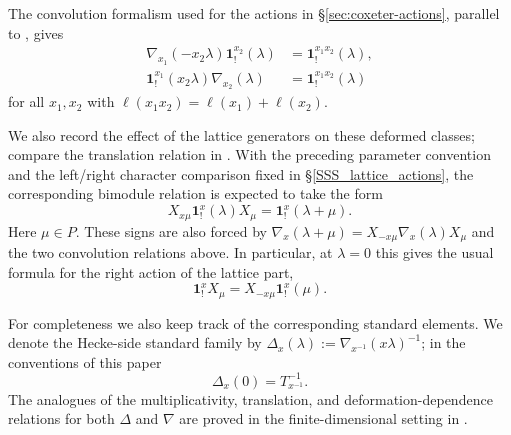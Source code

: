 \documentclass{amsart}
\newcommand{\bone}{\mathbf{1}}
\theoremstyle{definition}
\numberwithin{equation}{section}
\begin{document}
The convolution formalism used for the
actions in \S\ref{sec:coxeter-actions}, parallel to
\cite[Theorem~3.12(1)]{DMB}, gives
\begin{align}
\label{eq:twisted-bimodule-action}
\nabla_{x_1}(-x_2\lambda)\bone_!^{x_2}(\lambda)& =\bone_!^{x_1x_2}(\lambda),\\
\label{eq:twisted-bimodule-right-action}
\bone_!^{x_1}(x_2\lambda)\nabla_{x_2}(\lambda)& =\bone_!^{x_1x_2}(\lambda)
\end{align}
for all $x_1, x_2$ with $\ell(x_1x_2) = \ell(x_1) + \ell(x_2)$. 

We also record the effect of the lattice generators on these deformed classes;
compare the translation relation in
\cite[Theorem~3.12(4)]{DMB}. With the preceding parameter convention and the
left/right character comparison fixed in \S\ref{SSS_lattice_actions}, the
corresponding bimodule relation is expected to take the form
\begin{equation}\label{eq:twisted-bimodule-parameter-translation}
X_{x\mu}\bone_!^x(\lambda)X_{\mu}
=
\bone_!^x(\lambda+\mu).
\end{equation}
Here \(\mu\in P\). These signs are also forced by
\(\nabla_x(\lambda+\mu)=X_{-x\mu}\nabla_x(\lambda)X_\mu\) and the two
convolution relations above.
In particular, at $\lambda=0$ this gives the usual formula for
the right action of the lattice part,
\begin{equation}\label{eq:twisted-bimodule-right-lattice-action}
\bone_!^xX_\mu
=
X_{-x\mu}\bone_!^x(\mu).
\end{equation}

For completeness we also keep track of the corresponding standard
elements. We denote the Hecke-side standard family by
\(\Delta_x(\lambda):=\nabla_{x^{-1}}(x\lambda)^{-1}\); in the conventions of this paper
\[
\Delta_x(0)=T_{x^{-1}}^{-1}.
\]
The analogues of the multiplicativity, translation, and
deformation-dependence relations for both \(\Delta\) and \(\nabla\) are proved
in the finite-dimensional setting in \cite[Theorems~3.12--3.13]{DMB}.
\end{document}

